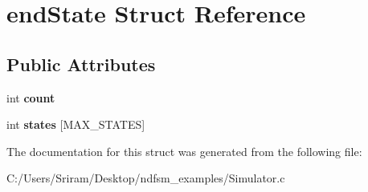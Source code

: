 \hypertarget{structend_state}{}\section{end\+State Struct Reference}
\label{structend_state}
\subsection*{Public Attributes}
\begin{DoxyCompactItemize}
\item 
\hypertarget{structend_state_a4bdf42bb2f2d1672ff1c42be4da2b2d3}{}int {\bfseries count}\label{structend_state_a4bdf42bb2f2d1672ff1c42be4da2b2d3}

\item 
\hypertarget{structend_state_a64c4ad34a723faa77dc6d9c42bf05e60}{}int {\bfseries states} \mbox{[}M\+A\+X\+\_\+\+S\+T\+A\+T\+E\+S\mbox{]}\label{structend_state_a64c4ad34a723faa77dc6d9c42bf05e60}

\end{DoxyCompactItemize}


The documentation for this struct was generated from the following file\+:\begin{DoxyCompactItemize}
\item 
C\+:/\+Users/\+Sriram/\+Desktop/ndfsm\+\_\+examples/Simulator.\+c\end{DoxyCompactItemize}
